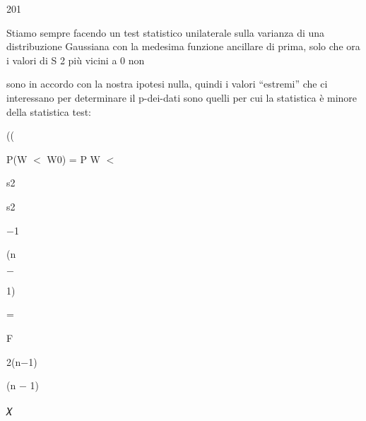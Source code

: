 \documentclass[a4paper,portrait,12pt]{article}
\begin{document}
201





\begin{flushleft}
Stiamo sempre facendo un test statistico unilaterale sulla varianza di una distribuzione Gaussiana con la medesima funzione ancillare di prima, solo che ora i valori di S 2 più vicini a 0 non
\end{flushleft}


\begin{flushleft}
sono in accordo con la nostra ipotesi nulla, quindi i valori {``}estremi'' che ci interessano per determinare il p-dei-dati sono quelli per cui la statistica \`{e} minore della statistica test:
\end{flushleft}





((





\begin{flushleft}
P(W $<$ W0) = P W $<$
\end{flushleft}





\begin{flushleft}
s2
\end{flushleft}


\begin{flushleft}
s2
\end{flushleft}


$-$1


\begin{flushleft}
(n
\end{flushleft}


$-$


1)


=


\begin{flushleft}
F
\end{flushleft}


\begin{flushleft}
2(n$-$1)
\end{flushleft}


\begin{flushleft}
(n $-$ 1)
\end{flushleft}


\begin{flushleft}
𝜒
\end{flushleft}
\end{document}
